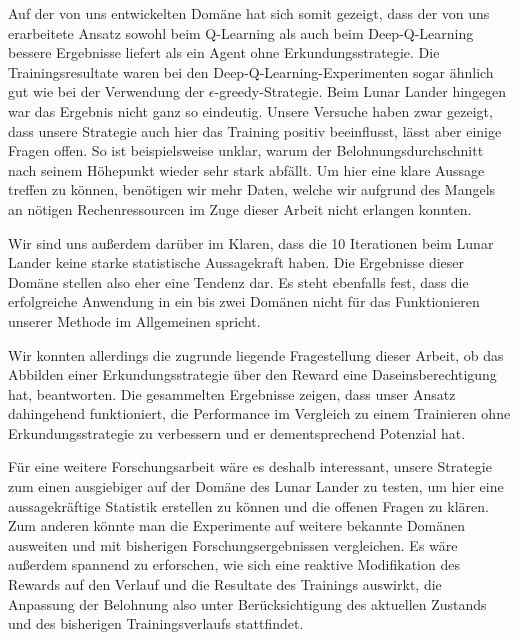 Auf der von uns entwickelten Domäne hat sich somit gezeigt, dass der von uns erarbeitete Ansatz sowohl beim Q-Learning als auch beim Deep-Q-Learning bessere Ergebnisse liefert als ein Agent ohne Erkundungsstrategie. Die Trainingsresultate waren bei den Deep-Q-Learning-Experimenten sogar ähnlich gut wie bei der Verwendung der $ \epsilon $-greedy-Strategie. Beim Lunar Lander hingegen war das Ergebnis nicht ganz so eindeutig. Unsere Versuche haben zwar gezeigt, dass unsere Strategie auch hier das Training positiv beeinflusst, lässt aber einige Fragen offen. So ist beispielsweise unklar, warum der Belohnungsdurchschnitt nach seinem Höhepunkt wieder sehr stark abfällt. Um hier eine klare Aussage treffen zu können, benötigen wir mehr Daten, welche wir aufgrund des Mangels an nötigen Rechenressourcen im Zuge dieser Arbeit nicht erlangen konnten. 

Wir sind uns außerdem darüber im Klaren, dass die 10 Iterationen beim Lunar Lander keine starke statistische Aussagekraft haben. Die Ergebnisse dieser Domäne stellen also eher eine Tendenz dar. Es steht ebenfalls fest, dass die erfolgreiche Anwendung in ein bis zwei Domänen nicht für das Funktionieren unserer Methode im Allgemeinen spricht.

Wir konnten allerdings die zugrunde liegende Fragestellung dieser Arbeit, ob das Abbilden einer Erkundungsstrategie über den Reward eine Daseinsberechtigung hat, beantworten. Die gesammelten Ergebnisse zeigen, dass unser Ansatz dahingehend funktioniert, die Performance im Vergleich zu einem Trainieren ohne Erkundungsstrategie zu verbessern und er dementsprechend Potenzial hat.

Für eine weitere Forschungsarbeit wäre es deshalb interessant, unsere Strategie zum einen ausgiebiger auf der Domäne des Lunar Lander zu testen, um hier eine aussagekräftige Statistik erstellen zu können und die offenen Fragen zu klären. Zum anderen könnte man die Experimente auf weitere bekannte Domänen ausweiten und mit bisherigen Forschungsergebnissen vergleichen. Es wäre außerdem spannend zu erforschen, wie sich eine reaktive Modifikation des Rewards auf den Verlauf und die Resultate des Trainings auswirkt, die Anpassung der Belohnung also unter Berücksichtigung des aktuellen Zustands und des bisherigen Trainingsverlaufs stattfindet.
